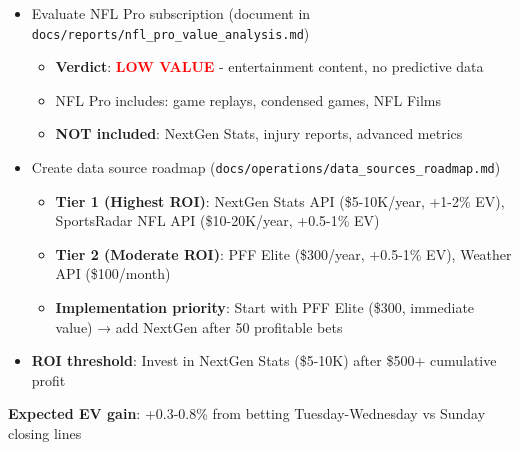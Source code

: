\begin{itemize}
  \item {} Evaluate NFL Pro subscription (document in \texttt{docs/reports/nfl\_pro\_value\_analysis.md})
  \begin{itemize}
    \item \textbf{Verdict}: \textcolor{red}{\textbf{LOW VALUE}} - entertainment content, no predictive data
    \item NFL Pro includes: game replays, condensed games, NFL Films
    \item \textbf{NOT included}: NextGen Stats, injury reports, advanced metrics
  \end{itemize}
  \item {} Create data source roadmap (\texttt{docs/operations/data\_sources\_roadmap.md})
  \begin{itemize}
    \item \textbf{Tier 1 (Highest ROI)}: NextGen Stats API (\$5-10K/year, +1-2\% EV), SportsRadar NFL API (\$10-20K/year, +0.5-1\% EV)
    \item \textbf{Tier 2 (Moderate ROI)}: PFF Elite (\$300/year, +0.5-1\% EV), Weather API (\$100/month)
    \item \textbf{Implementation priority}: Start with PFF Elite (\$300, immediate value) → add NextGen after 50 profitable bets
  \end{itemize}
  \item {} \textbf{ROI threshold}: Invest in NextGen Stats (\$5-10K) after \$500+ cumulative profit
\end{itemize}

\textbf{Expected EV gain}: +0.3-0.8\% from betting Tuesday-Wednesday vs Sunday closing lines

